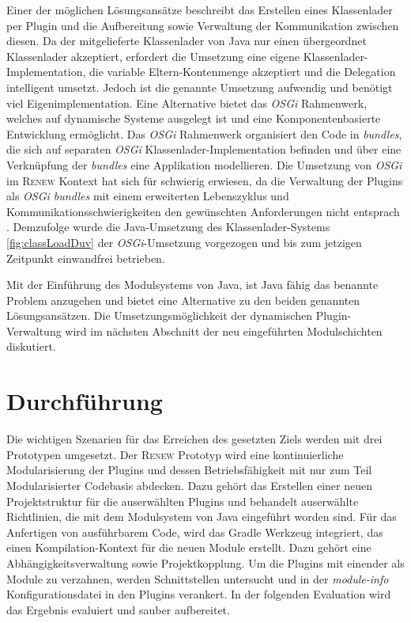 		Einer der möglichen Lösungsansätze beschreibt das Erstellen eines Klassenlader per Plugin und die Aufbereitung sowie Verwaltung der Kommunikation zwischen diesen. Da der mitgelieferte Klassenlader von Java nur einen übergeordnet Klassenlader akzeptiert, erfordert die Umsetzung eine eigene Klassenlader-Implementation, die variable Eltern-Kontenmenge akzeptiert und die Delegation intelligent umsetzt. Jedoch ist die genannte Umsetzung aufwendig und benötigt viel Eigenimplementation. \newline
		Eine Alternative bietet das \textit{OSGi} Rahmenwerk, welches auf dynamische Systeme ausgelegt ist und eine Komponentenbasierte Entwicklung ermöglicht. Das \textit{OSGi} Rahmenwerk organisiert den Code in \textit{bundles}, die sich auf separaten \textit{OSGi} Klassenlader-Implementation befinden und über eine Verknüpfung der \textit{bundles} eine Applikation modellieren. \newline
		Die Umsetzung von \textit{OSGi} im \textsc{Renew} Kontext hat sich für schwierig erwiesen, da die Verwaltung der Plugins als \textit{OSGi bundles} mit einem erweiterten Lebenszyklus und Kommunikationsschwierigkeiten den gewünschten Anforderungen nicht entsprach \cite{Duvigneau09}. Demzufolge wurde die Java-Umsetzung des Klassenlader-Systems \ref{fig:classLoadDuv} der \textit{OSGi}-Umsetzung vorgezogen und bis zum jetzigen Zeitpunkt einwandfrei betrieben. \bigbreak

		Mit der Einführung des Modulsystems von Java, ist Java fähig das benannte Problem anzugehen und bietet eine Alternative zu den beiden genannten Lösungsansätzen. Die Umsetzungsmöglichkeit der dynamischen Plugin-Verwaltung wird im nächsten Abschnitt der neu eingeführten Modulschichten diskutiert. 


\section{Durchführung} \label{sec:durchführung}
	Die wichtigen Szenarien für das Erreichen des gesetzten Ziels werden mit drei Prototypen umgesetzt. Der \textsc{Renew} Prototyp wird eine kontinuierliche Modularisierung der Plugins und dessen Betriebsfähigkeit mit nur zum Teil Modularisierter Codebasis abdecken. Dazu gehört das Erstellen einer neuen Projektstruktur für die auserwählten Plugins und behandelt auserwählte Richtlinien, die mit dem Modulsystem von Java eingeführt worden sind. Für das Anfertigen von ausführbarem Code, wird das Gradle Werkzeug integriert, das einen Kompilation-Kontext für die neuen Module erstellt. Dazu gehört eine Abhängigkeitsverwaltung sowie Projektkopplung. Um die Plugins mit einender als Module zu verzahnen, werden Schnittstellen untersucht und in der \textit{module-info} Konfigurationsdatei in den Plugins verankert. In der folgenden Evaluation wird das Ergebnis evaluiert und sauber aufbereitet.\bigbreak 

